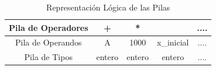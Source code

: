 \begin{table}[htbp]
    \centering
    \begin{tabular}{c|c c c c}
         \hline
        Pila de Operadores & + & * & & ....   \\\hline \hline
        Pila de Operandos &  A & 1000 & x\_inicial & ....\\\hline \hline
        Pila de Tipos & entero & entero & entero & .... \\\hline \hline
    \end{tabular}
    \caption{Representación Lógica de las Pilas}
    \label{tab:my_label}
\end{table}
